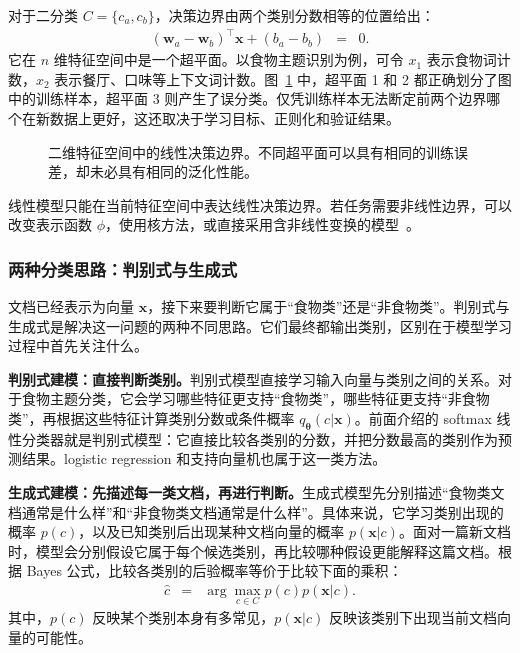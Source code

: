 对于二分类 $C=\{c_a,c_b\}$，决策边界由两个类别分数相等的位置给出：
\begin{eqnarray}
(\mathbf{w}_{a}-\mathbf{w}_{b})^{\top}\mathbf{x}
+(b_a-b_b)
& = & 0.
\end{eqnarray}
它在 $n$ 维特征空间中是一个超平面。以食物主题识别为例，可令 $x_1$ 表示食物词计数，$x_2$ 表示餐厅、口味等上下文词计数。图~\ref{fig:aml-separating-hyperplanes} 中，超平面 1 和 2 都正确划分了图中的训练样本，超平面 3 则产生了误分类。仅凭训练样本无法断定前两个边界哪个在新数据上更好，这还取决于学习目标、正则化和验证结果。

\begin{figure}[htbp]
  \centering
  
  \caption{二维特征空间中的线性决策边界。不同超平面可以具有相同的训练误差，却未必具有相同的泛化性能。}
  \label{fig:aml-separating-hyperplanes}
\end{figure}

线性模型只能在当前特征空间中表达线性决策边界。若任务需要非线性边界，可以改变表示函数 $\phi$，使用核方法，或直接采用含非线性变换的模型~\cite{Cortes-and-Vapnik:1995}。

\subsubsection{两种分类思路：判别式与生成式}

文档已经表示为向量 $\mathbf{x}$，接下来要判断它属于“食物类”还是“非食物类”。判别式与生成式是解决这一问题的两种不同思路。它们最终都输出类别，区别在于模型学习过程中首先关注什么。

\textbf{判别式建模：直接判断类别。}判别式模型直接学习输入向量与类别之间的关系。对于食物主题分类，它会学习哪些特征更支持“食物类”，哪些特征更支持“非食物类”，再根据这些特征计算类别分数或条件概率 $q_{\boldsymbol{\theta}}(c|\mathbf{x})$。前面介绍的 softmax 线性分类器就是判别式模型：它直接比较各类别的分数，并把分数最高的类别作为预测结果。logistic regression 和支持向量机也属于这一类方法。

\textbf{生成式建模：先描述每一类文档，再进行判断。}生成式模型先分别描述“食物类文档通常是什么样”和“非食物类文档通常是什么样”。具体来说，它学习类别出现的概率 $p(c)$，以及已知类别后出现某种文档向量的概率 $p(\mathbf{x}|c)$。面对一篇新文档时，模型会分别假设它属于每个候选类别，再比较哪种假设更能解释这篇文档。根据 Bayes 公式，比较各类别的后验概率等价于比较下面的乘积：
\begin{eqnarray}
\hat{c}
& = &
\arg\max_{c\in C}p(c)p(\mathbf{x}|c).
\end{eqnarray}
其中，$p(c)$ 反映某个类别本身有多常见，$p(\mathbf{x}|c)$ 反映该类别下出现当前文档向量的可能性。

